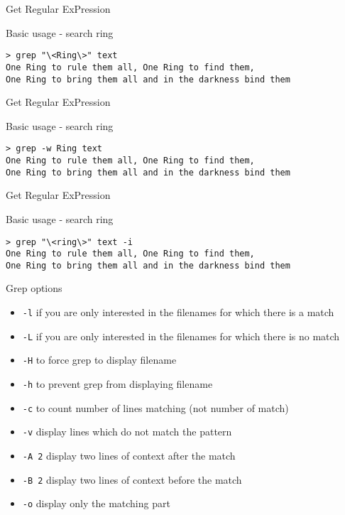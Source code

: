 \begin{frame}[fragile]{Get Regular ExPression}
  \begin{exampleblock}{Basic usage - search ring}
    \begin{lstlisting}[showstringspaces=false,basicstyle=\tiny]
> grep "\<Ring\>" text
One Ring to rule them all, One Ring to find them,
One Ring to bring them all and in the darkness bind them
    \end{lstlisting}
  \end{exampleblock}
\end{frame}


\begin{frame}[fragile]{Get Regular ExPression}
  \begin{exampleblock}{Basic usage - search ring}
    \begin{lstlisting}[showstringspaces=false,basicstyle=\tiny]
> grep -w Ring text
One Ring to rule them all, One Ring to find them,
One Ring to bring them all and in the darkness bind them
    \end{lstlisting}
  \end{exampleblock}
\end{frame}


\begin{frame}[fragile]{Get Regular ExPression}
  \begin{exampleblock}{Basic usage - search ring}
    \begin{lstlisting}[showstringspaces=false,basicstyle=\tiny]
> grep "\<ring\>" text -i
One Ring to rule them all, One Ring to find them,
One Ring to bring them all and in the darkness bind them
    \end{lstlisting}
  \end{exampleblock}
\end{frame}


\begin{frame}[fragile]{Grep options}
  \begin{itemize}
    \item \texttt{-l} if you are only interested in the filenames for which there is a match
    \pause \item \texttt{-L} if you are only interested in the filenames for which there is no match
    \pause \item \texttt{-H} to force grep to display filename
    \pause \item \texttt{-h} to prevent grep from displaying filename
    \pause \item \texttt{-c} to count number of lines matching (not number of match)
    \pause \item \texttt{-v} display lines which do not match the pattern
    \pause \item \texttt{-A 2} display two lines of context after the match
    \pause \item \texttt{-B 2} display two lines of context before the match
    \pause \item \texttt{-o} display only the matching part
  \end{itemize}
\end{frame}



